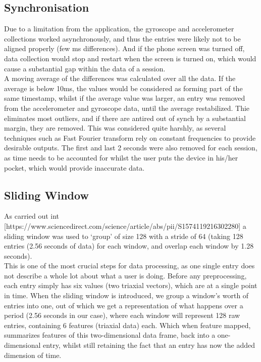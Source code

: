 \subsection{Synchronisation}
Due to a limitation from the application, the gyroscope and accelerometer collections worked asynchronously, and thus the entries were likely not to be aligned properly (few ms differences). And if the phone screen was turned off, data collection would stop and restart when the screen is turned on, which would cause a substantial gap within the data of a session.\\
A moving average of the differences was calculated over all the data. If the average is below 10ms, the values would be considered as forming part of the same timestamp, whilst if the average value was larger, an entry was removed from the accelerometer and gyroscope data, until the average restabilized. Thie eliminates most outliers, and if there are antired out of synch by a substantial margin, they are removed. This was considered quite harshly, as several techniques such as Fast Fourier transform rely on constant frequencies to provide desirable outputs. 
The first and last 2 seconds were also removed for each session, as time needs to be accounted for whilst the user puts the device in his/her pocket, which would provide inaccurate data. 


\subsection{Sliding Window}
As carried out int [https://www.sciencedirect.com/science/article/abs/pii/S1574119216302280] a sliding window was used to ‘group’ of size 128 with a stride of 64 (taking 128 entries (2.56 seconds of data) for each window, and overlap each window by 1.28 seconds).\\
This is one of the most crucial steps for data processing, as one single entry does not describe a whole lot about what a user is doing. Before any preprocessing, each entry simply has six values (two triaxial vectors), which are at a single point in time. When the sliding window is introduced, we group a window’s worth of entries into one, out of which we get a representation of what happens over a period (2.56 seconds in our case), where each window will represent 128 raw entries, containing 6 features (triaxial data) each. Which when feature mapped, summarizes features of this two-dimensional data frame, back into a one-dimensional entry, whilst still retaining the fact that an entry has now the added dimension of time.

